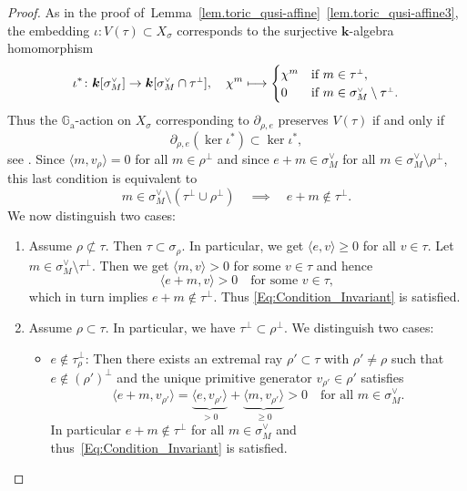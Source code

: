\documentclass[JEP,XML,SOM,Unicode]{cedram}
\def\mto{\mathchoice{\longmapsto}{\mapsto}{\mapsto}{\mapsto}}
\newcommand{\ra}{\mathrm{a}}
\let\oldvee\vee
\renewcommand{\vee}{{\scriptscriptstyle\oldvee}}
\let\oldbot\bot
\renewcommand{\bot}{{\scriptscriptstyle\oldbot}}
\theoremstyle{plain}
\theoremstyle{definition}
\newcommand{\GG}{\mathbb{G}}
\newcommand{\kk}{{\boldsymbol{k}}}
\newcommand{\sprod}[2]{\langle #1, #2 \rangle}
\begin{document}
\begin{proof}
As in the proof of~Lemma~\ref{lem.toric_qusi-affine}~\eqref{lem.toric_qusi-affine3},
the embedding
$\iota \colon V(\tau) \subset X_\sigma$ corresponds to the surjective $\kk$-algebra homomorphism
\[
\iota^\ast \colon \kk[\sigma^{\vee}_M] \to \kk[\sigma^{\vee}_M \cap \tau^{\bot}],
\quad
\chi^m \mto \begin{cases}
\chi^m & \textrm{if $m \in \tau^{\bot}$}, \\
0 & \textrm{if $m \in \sigma_M^\vee \setminus \tau^\bot$}.
\end{cases}
\]
Thus the $\GG_\ra$-action on $X_\sigma$ corresponding to $\partial_{\rho, e}$
preserves $V(\tau)$ if and only
if
\[
\partial_{\rho, e}(\ker \iota^\ast) \subset \ker \iota^\ast,
\]
see \cite[\S 1.5]{Fr2017Algebraic-theory-o}.
Since $\sprod{m}{v_\rho} = 0$ for all $m \in \rho^\bot$
and since $e + m \in \sigma^\vee_M$ for all $m \in \sigma^\vee_M \setminus \rho^\bot$,
this last condition is equivalent to
\[
\label{Eq:Condition_Invariant}
\tag{$\odot$}
m \in \sigma_M^\vee \setminus (\tau^\bot \cup \rho^\bot) \quad \implies \quad
e+m \not\in \tau^\bot.
\]
We now distinguish two cases:
\begin{enumerate}
\item Assume $\rho \not\subset \tau$. Then $\tau \subset \sigma_\rho$. In particular, we
get $\sprod{e}{v} \geq 0$ for all $v \in \tau$.
Let $m \in \sigma_M^\vee \setminus \tau^\bot$. Then
we get $\sprod{m}{v} > 0$ for some $v \in \tau$ and hence
\[
\sprod{e+m}{v} > 0 \quad \textrm{for some $v \in \tau$},
\]
which in turn implies $e + m \not\in \tau^\bot$. Thus
\eqref{Eq:Condition_Invariant} is satisfied.
\item Assume $\rho \subset \tau$. In particular, we have $\tau^\bot \subset \rho^\bot$.
We distinguish two cases:
\begin{itemize}
\item $e \not\in \tau_{\rho}^\bot$: Then there exists an
extremal ray $\rho' \subset \tau$ with $\rho' \neq \rho$ such that $e \not\in (\rho')^\bot$ and
the unique primitive generator
$v_{\rho'} \in \rho'$ satisfies
\[
\sprod{e+m}{v_{\rho'}} = \underbrace{\sprod{e}{v_{\rho'}}}_{>0} + \underbrace{\sprod{m}{v_{\rho'}}}_{\geq 0}
> 0 \quad \textrm{for all $m \in \sigma_M^\vee$}.
\]
In particular $e+m \not\in \tau^\bot$
for all $m \in \sigma_M^\vee$ and thus~\eqref{Eq:Condition_Invariant} is satisfied.


\end{itemize}
\end{enumerate}
\end{proof}
\end{document}
